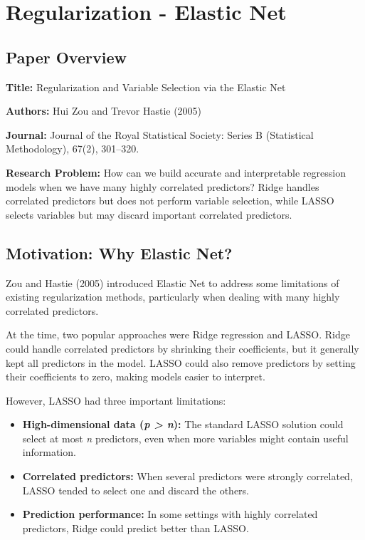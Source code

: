 \documentclass[
  letterpaper,
  DIV=11,
  numbers=noendperiod]{scrreprt}
\providecommand{\tightlist}{%
  \setlength{\itemsep}{0pt}\setlength{\parskip}{0pt}}
\begin{document}

\chapter{Regularization - Elastic
Net}\label{regularization---elastic-net}

\section{Paper Overview}\label{paper-overview}

\textbf{Title:} Regularization and Variable Selection via the Elastic
Net

\textbf{Authors:} Hui Zou and Trevor Hastie (2005)

\textbf{Journal:} Journal of the Royal Statistical Society: Series B
(Statistical Methodology), 67(2), 301--320.

\textbf{Research Problem:} How can we build accurate and interpretable
regression models when we have many highly correlated predictors? Ridge
handles correlated predictors but does not perform variable selection,
while LASSO selects variables but may discard important correlated
predictors.

\section{Motivation: Why Elastic Net?}\label{motivation-why-elastic-net}

Zou and Hastie (2005) introduced Elastic Net to address some limitations
of existing regularization methods, particularly when dealing with many
highly correlated predictors.

At the time, two popular approaches were Ridge regression and LASSO.
Ridge could handle correlated predictors by shrinking their
coefficients, but it generally kept all predictors in the model. LASSO
could also remove predictors by setting their coefficients to zero,
making models easier to interpret.

However, LASSO had three important limitations:

\begin{itemize}
\tightlist
\item
  \textbf{High-dimensional data (\emph{p \textgreater{} n}):} The
  standard LASSO solution could select at most \emph{n} predictors, even
  when more variables might contain useful information.
\item
  \textbf{Correlated predictors:} When several predictors were strongly
  correlated, LASSO tended to select one and discard the others.
\item
  \textbf{Prediction performance:} In some settings with highly
  correlated predictors, Ridge could predict better than LASSO.
\end{itemize}
\end{document}
